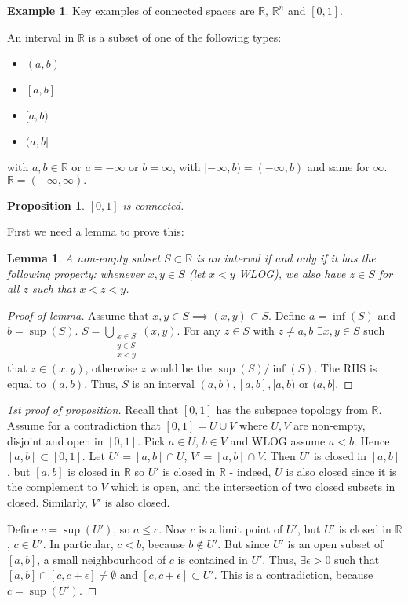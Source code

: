 \documentclass{article}
\theoremstyle{definition}
\newtheorem{exmp}{Example}[section]
\theoremstyle{plain}%
\newtheorem{lem}[thm]{Lemma}
\newtheorem{prop}[thm]{Proposition}
\theoremstyle{remark}
\newcommand{\union}{\cup}
\newcommand{\Union}{\bigcup}
\newcommand{\intersection}{\cap}
\newcommand{\R}{\mathbb{R}}
\begin{document}
\begin{exmp}
    Key examples of connected spaces are $\R$, $\R^n$ and $[0,1]$.
\end{exmp}

An interval in $\R$ is a subset of one of the following types:
\begin{itemize}
    \item $(a,b)$
    \item $[a,b]$
    \item $[a,b)$
    \item $(a,b]$
\end{itemize}
with $a,b \in \R$ or $a = -\infty$ or $b = \infty$, with $[-\infty, b) = (-\infty, b)$ and same for $\infty$. $\R = (-\infty, \infty).$

\begin{prop}
    $[0,1]$ is connected.
\end{prop}

First we need a lemma to prove this:

\begin{lem}\label{Interval definition lemma}
    A non-empty subset $S \subset \R$ is an interval if and only if it has the following property: whenever $x,y \in S$ (let $x < y$ WLOG), we also have $z \in S$ for all $z$ such that $x < z < y$.
\end{lem}

\begin{proof}[Proof of lemma]
    Assume that $x,y \in S \implies (x,y) \subset S$. Define $a = \inf(S)$ and $b = \sup(S)$. $S = \Union_{\substack{x \in S \\ y \in S \\ x < y}} (x,y)$. For any $z \in S$ with $z \ne a, b$ $\exists x,y \in S$ such that $z \in (x,y)$, otherwise $z$ would be the $\sup(S)/\inf(S)$. The RHS is equal to $(a,b)$. Thus, $S$ is an interval $(a,b), [a,b], [a,b)$ or $(a,b]$.
\end{proof}

\begin{proof}[1st proof of proposition]
    Recall that $[0,1]$ has the subspace topology from $\R$. Assume for a contradiction that $[0,1] = U \union V$ where $U,V$ are non-empty, disjoint and open in $[0,1]$. Pick $a \in U$, $b \in V$ and WLOG assume $a < b$. Hence $[a,b] \subset [0,1]$. Let $U' = [a,b] \intersection U$, $V' = [a,b] \intersection V$. Then $U'$ is closed in $[a,b]$, but $[a,b]$ is closed in $\R$ so $U'$ is closed in $\R$ - indeed, $U$ is also closed since it is the complement to $V$ which is open, and the intersection of two closed subsets in closed. Similarly, $V'$ is also closed.
    
    Define $c = \sup(U')$, so $a \le c$. Now $c$ is a limit point of $U'$, but $U'$ is closed in $\R$, $c \in U'$. In particular, $c < b$, because $b \not\in U'$. But since $U'$ is an open subset of $[a,b]$, a small neighbourhood of $c$ is contained in $U'$. Thus, $\exists \epsilon > 0$ such that $[a,b] \intersection [c,c+\epsilon] \ne \emptyset$ and $[c, c+ \epsilon] \subset U'$. This is a contradiction, because $c = \sup(U')$.
\end{proof}
\end{document}

